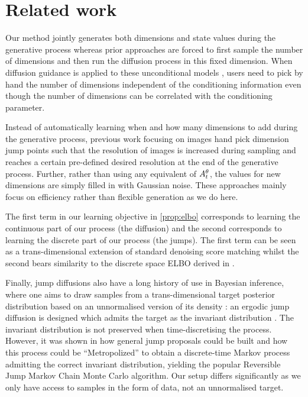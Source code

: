 


\section{Related work}

Our method jointly generates both dimensions and state values during the generative process whereas prior approaches \cite{hoogeboom2022equivariant, igashov2022equivariant} are forced to first sample the number of dimensions and then run the diffusion process in this fixed dimension. When diffusion guidance is applied to these unconditional models \cite{weiss2023guided, zhang2023towards}, users need to pick by hand the number of dimensions independent of the conditioning information even though the number of dimensions can be correlated with the conditioning parameter.

Instead of automatically learning when and how many dimensions to add during the generative process, previous work focusing on images \cite{jing2022subspace, zhang2022dimensionality} hand pick dimension jump points such that the resolution of images is increased during sampling and reaches a certain pre-defined desired resolution at the end of the generative process. Further, rather than using any equivalent of $A_t^\theta$, the values for new dimensions are simply filled in with Gaussian noise. These approaches mainly focus on efficiency rather than flexible generation as we do here.


The first term in our learning objective in \cref{prop:elbo} corresponds to learning the continuous part of our process (the diffusion) and the second corresponds to learning the discrete part of our process (the jumps). The first term can be seen as a trans-dimensional extension of standard denoising score matching \cite{vincent2011connection} whilst the second bears similarity to the discrete space ELBO derived in \cite{campbell2022continuous}.

Finally, jump diffusions also have a long history of use in Bayesian inference, where one aims to draw samples from a trans-dimensional target posterior distribution based on an unnormalised version of its density \cite{grenander1994representations}: an ergodic jump diffusion is designed which admits the target as the invariant distribution \cite{grenander1994representations,phillips1995bayesian,miller1997automatic}. The invariant distribution is not preserved when time-discretising the process.
However, it was shown in  \cite{green1995reversible,green2003trans} how general jump proposals could be built and how this process could be ``Metropolized'' to obtain a discrete-time Markov process admitting the correct invariant distribution, yielding the popular Reversible Jump Markov Chain Monte Carlo algorithm.
Our setup differs significantly as we only have access to samples in the form of data, not an unnormalised target.


